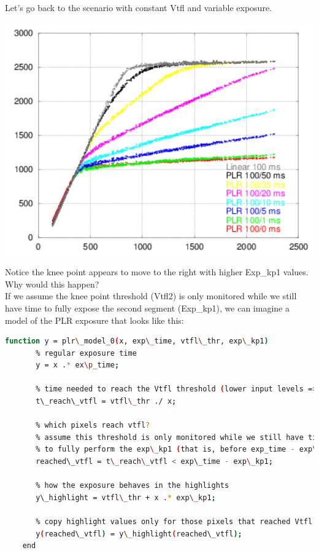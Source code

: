 Let's go back to the scenario with constant Vtfl and variable exposure. 

\begin{center}
\includegraphics[height=10cm]{images/100-x-32-plr-vs-30ms-lin}
\end{center}

Notice the knee point appears to move to the right with higher Exp\_kp1 values. Why would this happen?\\

If we assume the knee point threshold (Vtfl2) is only monitored while we still have time to fully expose the second segment (Exp\_kp1), we can imagine a model of the PLR exposure that looks like this:\\

\begin{lstlisting}[language=bash,morekeywords=$,keywordstyle=\bfseries,frame=none,xleftmargin=.25in,belowskip=2em, aboveskip=2em]
    function y = plr\_model_0(x, exp\_time, vtfl\_thr, exp\_kp1)
       % regular exposure time
       y = x .* ex\p_time;
       
       % time needed to reach the Vtfl threshold (lower input levels => longer times)
       t\_reach\_vtfl = vtfl\_thr ./ x;
       
       % which pixels reach vtfl?
       % assume this threshold is only monitored while we still have time
       % to fully perform the exp\_kp1 (that is, before exp_time - exp\_kp1)
       reached\_vtfl = t\_reach\_vtfl < exp\_time - exp\_kp1;
       
       % how the exposure behaves in the highlights
       y\_highlight = vtfl\_thr + x .* exp\_kp1;
       
       % copy highlight values only for those pixels that reached Vtfl
       y(reached\_vtfl) = y\_highlight(reached\_vtfl);
    end
\end{lstlisting}

